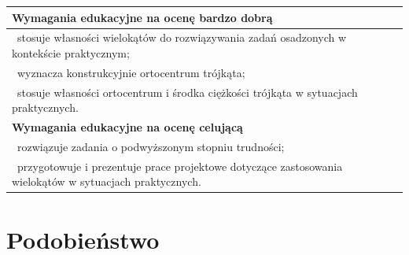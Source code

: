 \documentclass[12pt,a4paper]{article}
\begin{document}
\begin{longtable}{|p{16cm}|}
		\textbf{Wymagania edukacyjne na ocenę bardzo dobrą} \\ \hline
		
		\textbullet\ stosuje własności wielokątów do rozwiązywania zadań osadzonych w kontekście praktycznym; \\
		
		\textbullet\ wyznacza konstrukcyjnie ortocentrum trójkąta; \\
		
		\textbullet\ stosuje własności ortocentrum i środka ciężkości trójkąta w sytuacjach praktycznych. \\ \hline
		
		\textbf{Wymagania edukacyjne na ocenę celującą} \\ \hline
		
		\textbullet\ rozwiązuje zadania o podwyższonym stopniu trudności; \\
		
		\textbullet\ przygotowuje i prezentuje prace projektowe dotyczące zastosowania wielokątów w sytuacjach praktycznych. \\ \hline
		
	\end{longtable}
	
	\section{Podobieństwo}
	
\end{document}
